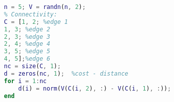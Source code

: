 \begin{lstlisting}[language=Matlab]
n = 5; V = randn(n, 2);
% Connectivity:
C = [1, 2; %edge 1
1, 3; %edge 2
2, 3; %edge 3
2, 4; %edge 4
3, 5; %edge 5
4, 5];%edge 6
nc = size(C, 1);
d = zeros(nc, 1);  %cost - distance
for i = 1:nc
	d(i) = norm(V(C(i, 2), :) - V(C(i, 1), :));
end
\end{lstlisting}
